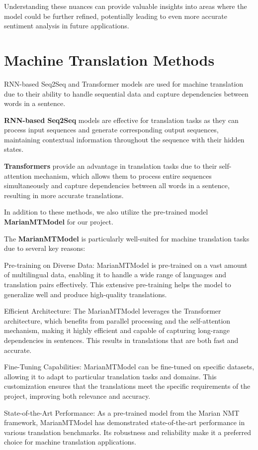 \documentclass{article}
\begin{document}
Understanding these nuances can provide valuable insights into areas where the model could be further refined, potentially leading to even more accurate sentiment analysis in future applications.


\section{Machine Translation Methods}
RNN-based Seq2Seq and Transformer models are used for machine translation due to their ability to handle sequential data and capture dependencies between words in a sentence.

\textbf{RNN-based Seq2Seq} models are effective for translation tasks as they can process input sequences and generate corresponding output sequences, maintaining contextual information throughout the sequence with their hidden states.

\textbf{Transformers} provide an advantage in translation tasks due to their self-attention mechanism, which allows them to process entire sequences simultaneously and capture dependencies between all words in a sentence, resulting in more accurate translations.

In addition to these methods, we also utilize the pre-trained model \textbf{MarianMTModel} for our project.

The \textbf{MarianMTModel} is particularly well-suited for machine translation tasks due to several key reasons:

Pre-training on Diverse Data: MarianMTModel is pre-trained on a vast amount of multilingual data, enabling it to handle a wide range of languages and translation pairs effectively. This extensive pre-training helps the model to generalize well and produce high-quality translations.

Efficient Architecture: The MarianMTModel leverages the Transformer architecture, which benefits from parallel processing and the self-attention mechanism, making it highly efficient and capable of capturing long-range dependencies in sentences. This results in translations that are both fast and accurate.

Fine-Tuning Capabilities: MarianMTModel can be fine-tuned on specific datasets, allowing it to adapt to particular translation tasks and domains. This customization ensures that the translations meet the specific requirements of the project, improving both relevance and accuracy.

State-of-the-Art Performance: As a pre-trained model from the Marian NMT framework, MarianMTModel has demonstrated state-of-the-art performance in various translation benchmarks. Its robustness and reliability make it a preferred choice for machine translation applications.
\end{document}
